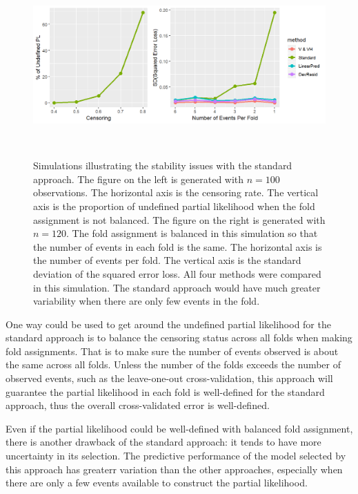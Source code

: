 \begin{figure}[h]
  \centering
  \includegraphics[height= 7cm ]{./manuscript_figure/figure_3.png}
  \caption{\label{Fig:stability} Simulations illustrating the stability issues with the standard approach. The figure on the left is generated with $n = 100$ observations. The horizontal axis is the censoring rate. The vertical axis is the proportion of undefined partial likelihood when the fold assignment is not balanced. The figure on the right is generated with $n = 120$. The fold assignment is balanced in this simulation so that the number of events in each fold is the same. The horizontal axis is the number of events per fold. The vertical axis is the standard deviation of the squared error loss. All four methods were compared in this simulation. The standard approach would have much greater variability when there are only few events in the fold.}
\end{figure}	
  
One way could be used to get around the undefined partial likelihood for the standard approach is to balance the censoring status across all folds when making fold assignments. That is to make sure the number of events observed is about the same across all folds. Unless the number of the folds exceeds the number of observed events, such as the leave-one-out cross-validation, this approach will guarantee the partial likelihood in each fold is well-defined for the standard approach, thus the overall cross-validated error is well-defined. 

Even if the partial likelihood could be well-defined with balanced fold assignment, there is another drawback of the standard approach: it tends to have more uncertainty in its selection. The predictive performance of the model selected by this approach has greaterr variation than the other approaches, especially when there are only a few events available to construct the partial likelihood. 

